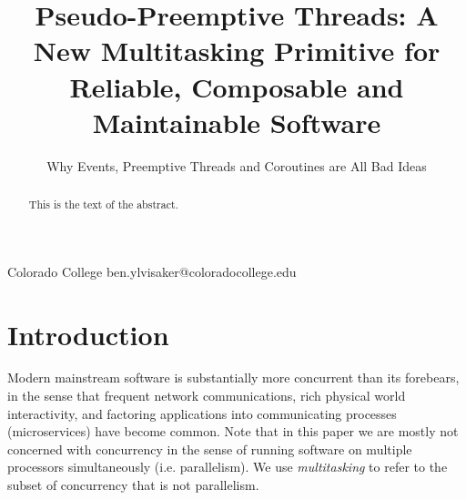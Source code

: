 \documentclass[10pt,preprint]{sigplanconf}
\begin{document}
\newcommand{\charcoal}{Charcoal}

\setlength{\pdfpageheight}{\paperheight}
\setlength{\pdfpagewidth}{\paperwidth}



\title{Pseudo-Preemptive Threads: A New Multitasking Primitive for Reliable, Composable and Maintainable Software}
\subtitle{Why Events, Preemptive Threads and Coroutines are All Bad Ideas\footnotemark}

           {Colorado College}
           {ben.ylvisaker@coloradocollege.edu}

\maketitle

\begin{abstract}
This is the text of the abstract.
\end{abstract}





\section{Introduction}

Modern mainstream software is substantially more concurrent than its forebears, in the sense that frequent network communications, rich physical world interactivity, and factoring applications into communicating processes (microservices) have become common.
Note that in this paper we are mostly not concerned with concurrency in the sense of running software on multiple processors simultaneously (i.e. parallelism).
We use \emph{multitasking} to refer to the subset of concurrency that is not parallelism.
\end{document}
